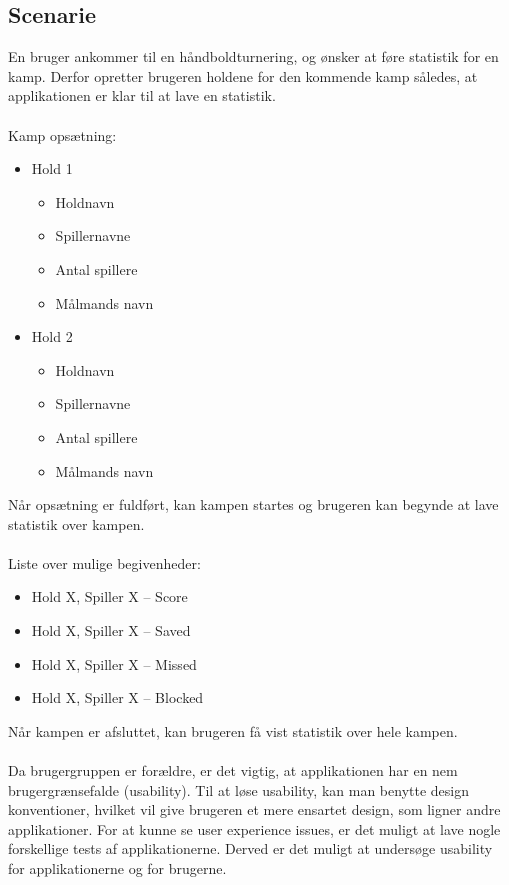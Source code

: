 \subsection*{Scenarie}
En bruger ankommer til en håndboldturnering, og ønsker at føre statistik for en kamp. Derfor opretter brugeren holdene for den kommende kamp således, at applikationen er klar til at lave en statistik.\\\\Kamp opsætning:
\begin{itemize}
\item Hold 1
	\begin{itemize}
	\item Holdnavn
	\item Spillernavne
	\item Antal spillere
	\item Målmands navn
	\end{itemize}
\item Hold 2
	\begin{itemize}
	\item Holdnavn
	\item Spillernavne
	\item Antal spillere
	\item Målmands navn\\
	\end{itemize}
\end{itemize}
Når opsætning  er fuldført, kan kampen startes og brugeren kan begynde at lave statistik over kampen.\\\\
Liste over mulige begivenheder:
\begin{itemize}
	\item Hold X, Spiller X – Score
	\item Hold X, Spiller X – Saved
	\item Hold X, Spiller X – Missed
	\item Hold X, Spiller X – Blocked\\
\end{itemize}
Når kampen er afsluttet, kan brugeren få vist statistik over hele kampen.\\\\Da brugergruppen er forældre, er det vigtig, at applikationen har en nem brugergrænsefalde (usability). Til at løse usability, kan man benytte design konventioner, hvilket vil give brugeren et mere ensartet design, som ligner andre applikationer. For at kunne se user experience issues, er det muligt at lave nogle forskellige tests af applikationerne. Derved er det muligt at undersøge usability for applikationerne og for brugerne. 

   
   
